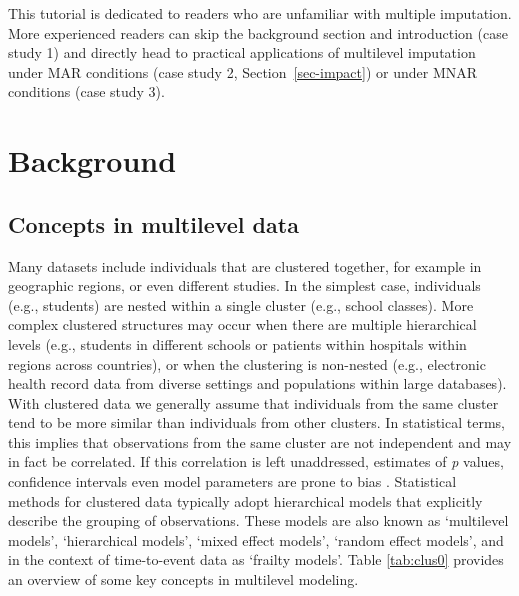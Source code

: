 \documentclass[
  article]{jss}
\begin{document}
This tutorial is dedicated to readers who are unfamiliar with multiple
imputation. More experienced readers can skip the background section and
introduction (case study 1) and directly head to practical applications
of multilevel imputation under MAR conditions (case study 2,
Section~\ref{sec-impact}) or under MNAR conditions (case study 3).

\hypertarget{sec-models}{%
\section{Background}\label{sec-models}}

\hypertarget{concepts-in-multilevel-data}{%
\subsection{Concepts in multilevel
data}\label{concepts-in-multilevel-data}}

Many datasets include individuals that are clustered together, for
example in geographic regions, or even different studies. In the
simplest case, individuals (e.g., students) are nested within a single
cluster (e.g., school classes). More complex clustered structures may
occur when there are multiple hierarchical levels (e.g., students in
different schools or patients within hospitals within regions across
countries), or when the clustering is non-nested (e.g., electronic
health record data from diverse settings and populations within large
databases). With clustered data we generally assume that individuals
from the same cluster tend to be more similar than individuals from
other clusters. In statistical terms, this implies that observations
from the same cluster are not independent and may in fact be correlated.
If this correlation is left unaddressed, estimates of \emph{p} values,
confidence intervals even model parameters are prone to bias
\citep{loca01}. Statistical methods for clustered data typically adopt
hierarchical models that explicitly describe the grouping of
observations. These models are also known as `multilevel models',
`hierarchical models', `mixed effect models', `random effect models',
and in the context of time-to-event data as `frailty models'. Table
\ref{tab:clus0} provides an overview of some key concepts in multilevel
modeling.
\end{document}
